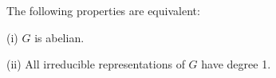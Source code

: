 The following properties are equivalent:

(i) $G$ is abelian.

(ii) All irreducible representations of $G$ have degree 1.
